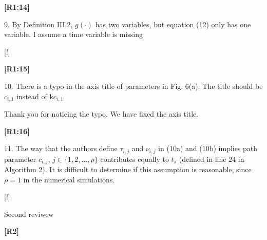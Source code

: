 \documentclass[10pt]{letter}
\begin{document}
{\hspace*{-4.5em}\textbf{[R1:14]}\vspace*{-1.9em}}

9. By Definition III.2, $g(\cdot)$ has two variables, but equation (12) only has one variable. I assume a time variable is missing

{\color{blue} 

{\hspace*{-4.5em}{[R1:14]}\vspace*{-1.9em}}

[!]}

{\hspace*{-4.5em}\textbf{[R1:15]}\vspace*{-1.9em}}

10. There is a typo in the axis title of parameters in Fig. 6(a). The title should be $c_{i,1}$ instead of k$c_{i,1}$

{\color{blue} 

{\hspace*{-4.5em}{[R1:15]}\vspace*{-1.9em}}

Thank you for noticing the typo. We have fixed the axis title.
}

{\hspace*{-4.5em}\textbf{[R1:16]}\vspace*{-1.9em}}

11. The way that the authors define $\tau_{i,j}$ and $\nu_{i,j}$ in (10a) and (10b) implies path parameter $c_{i,j}$, $j\in\{1,2,\dots,\rho\}$ contributes equally to $t_s$ (defined in line 24 in Algorithm 2). It is difficult to determine if this assumption is reasonable, since $\rho=1$ in the numerical simulations.

{\color{blue} 

{\hspace*{-4.5em}{[R1:16]}\vspace*{-1.9em}}

[!]}













\newpage

{Second reviwew}

\vspace{3em}

{\hspace*{-4.5em}\textbf{[R2]}\vspace*{-1.9em}}
\end{document}
